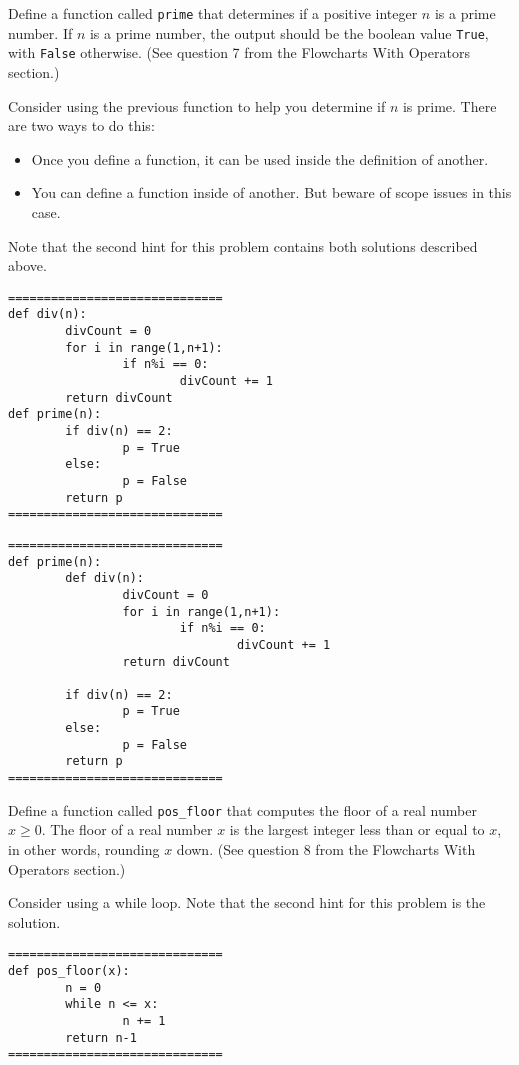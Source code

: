 \documentclass{ximera}
\begin{document}
\begin{question}
	Define a function called \verb|prime| that determines if a positive integer $n$ is a prime number. If $n$ is a prime number, the output should be the boolean value \verb|True|, with \verb|False| otherwise. (See question 7 from the Flowcharts With Operators section.)
	\begin{hint}
	Consider using the previous function to help you determine if $n$ is prime. There are two ways to do this:
	\begin{itemize}
	\item Once you define a function, it can be used inside the definition of another.
	\item You can define a function inside of another. But beware of scope issues in this case.
	\end{itemize}
	Note that the second hint for this problem contains both solutions described above.
	\end{hint}
	\begin{hint}
\begin{verbatim}
==============================
def div(n):
        divCount = 0
        for i in range(1,n+1):
                if n%i == 0:
                        divCount += 1
        return divCount
def prime(n):
        if div(n) == 2:
                p = True
        else:
                p = False
        return p
==============================
\end{verbatim}
\begin{verbatim}
==============================
def prime(n):
        def div(n):
                divCount = 0
                for i in range(1,n+1):
                        if n%i == 0:
                                divCount += 1
                return divCount

        if div(n) == 2:
                p = True
        else:
                p = False
        return p
==============================
\end{verbatim}
	\end{hint}
\end{question}

\begin{question}
	Define a function called \verb|pos_floor| that computes the floor of a real number $x\geq 0$. The floor of a real number $x$ is the largest integer less than or equal to $x$, in other words, rounding $x$ down. (See question 8 from the Flowcharts With Operators section.)
	\begin{hint}
	Consider using a while loop. Note that the second hint for this problem is the solution.
	\end{hint}
	\begin{hint}
\begin{verbatim}
==============================
def pos_floor(x):
        n = 0
        while n <= x:
                n += 1
        return n-1
==============================
\end{verbatim}
	\end{hint}
\end{question}
\end{document}
